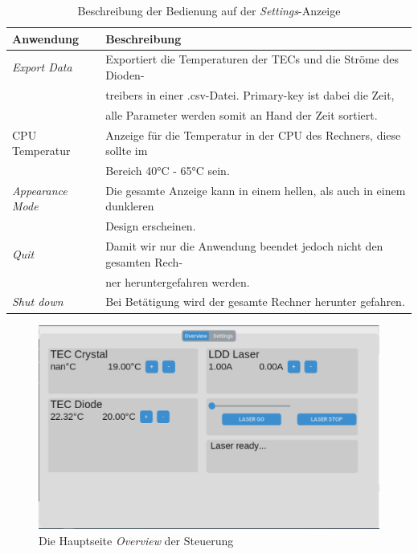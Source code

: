 \begin{table}[H]
    \centering
    \begin{tabular}{l|l}
         \textbf{Anwendung}&        \textbf{Beschreibung}\\
         \hline
         \textit{Export Data}&      Exportiert die Temperaturen der TECs und die Ströme des Dioden-\\
         &                          treibers in einer .csv-Datei. Primary-key ist dabei die Zeit,\\
         &                          alle  Parameter werden somit an Hand der Zeit sortiert.\\
         CPU Temperatur&            Anzeige für die Temperatur in der CPU des Rechners, diese sollte im\\
         &                          Bereich 40°C - 65°C sein.\\
         \textit{Appearance Mode}&  Die gesamte Anzeige kann in einem hellen, als auch in einem dunkleren\\
         &                          Design erscheinen.\\
         \textit{Quit}&             Damit wir nur die Anwendung beendet jedoch nicht den gesamten Rech-\\
         &                          ner heruntergefahren werden.\\
         \textit{Shut down}&        Bei Betätigung wird der gesamte Rechner herunter gefahren.
    \end{tabular}
    \caption{Beschreibung der Bedienung auf der \textit{Settings}-Anzeige}
    \label{tab:settings_beschriebung_sw}
\end{table}


\begin{figure}
    \centering
    \includegraphics[scale=0.3, trim={1mm 1mm 1mm 1mm},clip]{98_images/overview_window_large.PNG}
    \caption{Die Hauptseite \textit{Overview} der Steuerung}
    \label{fig:overview_sw}
\end{figure}

